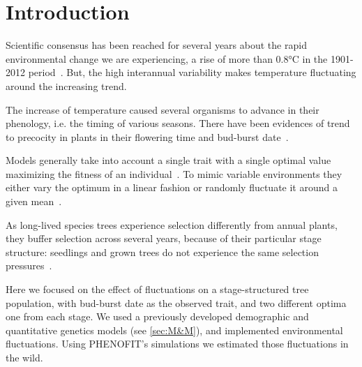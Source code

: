 \label{sec:Intro}
\section*{Introduction}

Scientific consensus has been reached for several years about the rapid environmental change we are experiencing, a rise of more than 0.8°C in the 1901-2012 period~\citep{stocker_ipcc_2013}. But, the high interannual variability makes temperature fluctuating around the increasing trend.

The increase of temperature caused several organisms to advance in their phenology, i.e. the timing of various seasons. There have been evidences of trend to precocity in plants in their flowering time and bud-burst date~\cite{alberto_adaptive_2011, gienapp_predicting_2013}.

Models generally take into account a single trait with a single optimal value maximizing the fitness of an individual~\citep{lande_quantitative_1982}. To mimic variable environments they either vary the optimum in a linear fashion or randomly fluctuate it around a given mean~\citep{lande_role_1996}.

As long-lived species trees experience selection differently from annual plants, they buffer selection across several years, because of their particular stage structure: seedlings and grown trees do not experience the same selection pressures~\citep{lande_quantitative_1982, coulson_dynamics_2008, barfield_evolution_2011, engen_evolution_2011}. 

Here we focused on the effect of fluctuations on a stage-structured tree population, with bud-burst date as the observed trait, and two different optima one from each stage.
We used a previously developed demographic and quantitative genetics models (see \ref{sec:M&M}), and implemented environmental fluctuations. Using \textsc{PHENOFIT}'s simulations we estimated those fluctuations in the wild.